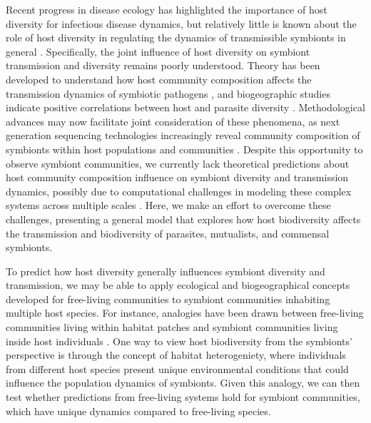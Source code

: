 Recent progress in disease ecology has highlighted the importance of host diversity for infectious disease dynamics, but relatively little is known about the role of host diversity in regulating the dynamics of transmissible symbionts in general \citep{Lively2014, Johnson2015}.
Specifically, the joint influence of host diversity on symbiont transmission and diversity remains poorly understood.
Theory has been developed to understand how host community composition affects the transmission dynamics of symbiotic pathogens \citep{Dobson2004, Roche2012, Joseph2013a, Mihaljevic2014}, and biogeographic studies indicate positive correlations between host and parasite diversity \citep{Nunn2005, Dunn2010a, Harris2010}.
Methodological advances may now facilitate joint consideration of these phenomena, as next generation sequencing technologies increasingly reveal community composition of symbionts within host populations and communities \citep{Prosser2007,Fierer2012,Costello2012a}.
Despite this opportunity to observe symbiont communities, we currently lack theoretical predictions about host community composition influence on symbiont diversity and transmission dynamics, possibly due to computational challenges in modeling these complex systems across multiple scales \citep{Gog2014}.
Here, we make an effort to overcome these challenges, presenting a general model that explores how host biodiversity affects the transmission and biodiversity of parasites, mutualists, and commensal symbionts.

To predict how host diversity generally influences symbiont diversity and transmission, we may be able to apply ecological and biogeographical concepts developed for free-living communities to symbiont communities inhabiting multiple host species.
For instance, analogies have been drawn between free-living communities living within habitat patches and symbiont communities living inside host individuals \citep{Mihaljevic2012,Richgels2013,Suzan2015}.
One way to view host biodiversity from the symbionts' perspective is through the concept of habitat heterogeniety, where individuals from different host species present unique environmental conditions that could influence the population dynamics of symbionts.
Given this analogy, we can then test whether predictions from free-living systems hold for symbiont communities, which have unique dynamics compared to free-living species.

